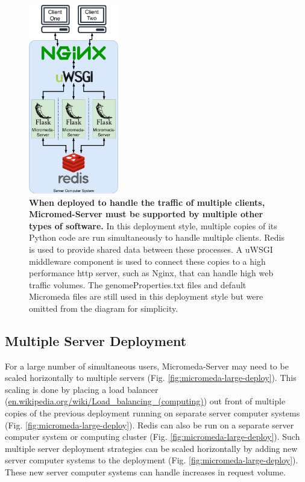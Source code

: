 \begin{figure}[!ht]
  \centering
	\includegraphics[width=0.35\textwidth]{media/micromeda-medium-deployment.pdf}
	 \caption[When deployed to handle the traffic of multiple clients, Micromed-Server must be supported by multiple other types of software.]{\textbf{When deployed to handle the traffic of multiple clients, Micromed-Server must be supported by multiple other types of software.} In this deployment style, multiple copies of its Python code are run simultaneously to handle multiple clients. Redis is used to provide shared data between these processes. A uWSGI middleware component is used to connect these copies to a high performance \gls{http} server, such as Nginx, that can handle high web traffic volumes. The genomeProperties.txt files and default Micromeda files are still used in this deployment style but were omitted from the diagram for simplicity.}
	 \label{fig:micromeda-medium-deploy}
\end{figure}

\subsection{Multiple Server Deployment} \label{multi-server-micromeda-deployment}

For a large number of simultaneous users, Micromeda-Server may need to be scaled horizontally to multiple servers (Fig. \ref{fig:micromeda-large-deploy}). This scaling is done by placing a load balancer (\href{http://en.wikipedia.org/wiki/Load_balancing_(computing)}{en.wikipedia.org/wiki/Load\_balancing\_(computing)}) out front of multiple copies of the previous deployment running on separate server computer systems (Fig. \ref{fig:micromeda-large-deploy}). Redis can also be run on a separate server computer system or computing cluster (Fig. \ref{fig:micromeda-large-deploy}). Such multiple server deployment strategies can be scaled horizontally by adding new server computer systems to the deployment (Fig. \ref{fig:micromeda-large-deploy}). These new server computer systems can handle increases in request volume.

